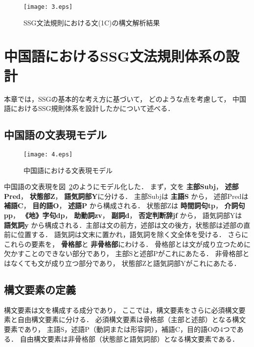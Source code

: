 \documentclass[japanese]{jnlp_1.3a}
\begin{document}
\begin{figure}[t]
  \begin{center}
       \texttt{[image: 3.eps]}
    \caption{SSG文法規則における文(1C)の構文解析結果}
    \label{fig:ssgres}
  \end{center}
\end{figure}

\section{中国語におけるSSG文法規則体系の設計}
本章では，SSGの基本的な考え方に基づいて，
どのような点を考慮して，
中国語におけるSSG規則体系を設計したかについて述べる．

\subsection{中国語の文表現モデル}
\begin{figure}[b]
  \centering
       \texttt{[image: 4.eps]}
  \caption{中国語における文表現モデル}
  \label{fig:cmodel}
\end{figure}

中国語の文表現を図~\ref{fig:cmodel}のようにモデル化した．
まず，文を
{\bf 主部Subj}，
{\bf 述部Pred}，
{\bf 状態部Z}，
{\bf 語気詞部Y}に分ける．
主部Subjは
{\bf 主語S}
から，
述部Predは
{\bf 補語C}，
{\bf 目的語O}，
{\bf 述語P}
から構成される．
状態部Zは
{\bf 時間詞句tp}，
{\bf 介詞句pp}，
{\bf《地》字句dp}，
{\bf 助動詞zv}，
{\bf 副詞d}，
{\bf 否定判断辞jf}
から，
語気詞部Yは
{\bf 語気詞y}
から構成される．主部は文の前方，述部は文の後方，状態部は述部の直前に位置する．
語気詞は文末に置かれ，語気詞を除く文全体を受ける．
さらにこれらの要素を，
{\bf 骨格部}と
{\bf 非骨格部}にわける．
骨格部とは文が成り立つために欠かすことのできない部分であり，
主部Sと述部Pがこれにあたる．
非骨格部とはなくても文が成り立つ部分であり，
状態部Zと語気詞部Yがこれにあたる．

\subsection{構文要素の定義}
構文要素は文を構成する成分であり，
ここでは，構文要素をさらに必須構文要素と自由構文要素に分ける．
必須構文要素は骨格部（主部と述部）となる構文要素であり，
主語S，述語P（動詞または形容詞），補語C，目的語Oの4つである．
自由構文要素は非骨格部（状態部と語気詞部）となる構文要素である．
\end{document}

